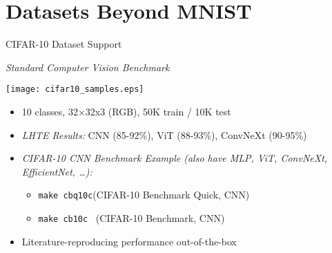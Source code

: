 \section[toc={New Dataset Formats}]{Datasets Beyond MNIST}

\begin{slide}[\slideopts,toc={CIFAR-10}]{CIFAR-10 Dataset Support}

  \vspace{-1em}
  
  \emph{Standard Computer Vision Benchmark}

  \vspace{0.5em}

    \texttt{[image: cifar10\_samples.eps]}
  
  \vspace{-0.5em}

  \begin{itemize}
    \item 10 classes, 32×32x3 (RGB), 50K train / 10K test
    
    \item \emph{LHTE Results:} CNN (85-92\%), ViT (88-93\%), ConvNeXt (90-95\%)
    
    \item \emph{CIFAR-10 CNN Benchmark Example (also have MLP, ViT, ConvNeXt, EfficientNet, \ldots):}  %
      \begin{itemize}
        \item \texttt{make cbq10c}\quad (CIFAR-10 Benchmark Quick, CNN)
        \item \texttt{make cb10c} \quad\, (CIFAR-10 Benchmark, CNN)
      \end{itemize}
    \item Literature-reproducing performance out-of-the-box
  \end{itemize}
  
\end{slide}

